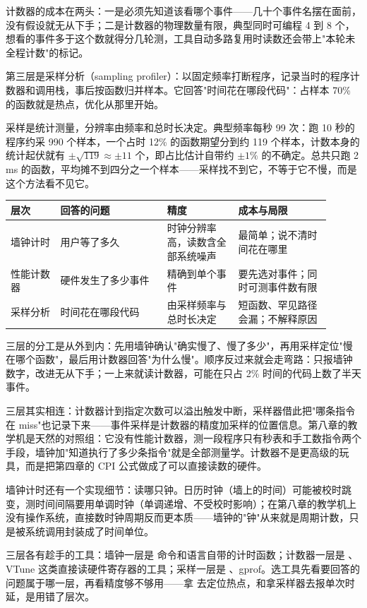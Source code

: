 计数器的成本在两头：一是必须先知道该看哪个事件——几十个事件名摆在面前，没有假设就无从下手；二是计数器的物理数量有限，典型同时可编程 4 到 8 个，想看的事件多于这个数就得分几轮测，工具自动多路复用时读数还会带上"本轮未全程计数"的标记。

第三层是采样分析（sampling profiler）：以固定频率打断程序，记录当时的程序计数器和调用栈，事后按函数归并样本。它回答"时间花在哪段代码"：占样本 70\% 的函数就是热点，优化从那里开始。

采样是统计测量，分辨率由频率和总时长决定。典型频率每秒 99 次：跑 10 秒的程序约采 990 个样本，一个占时 12\% 的函数期望分到约 119 个样本，计数本身的统计起伏就有 $\pm\sqrt{119}\approx\pm11$ 个，即占比估计自带约 $\pm1\%$ 的不确定。总共只跑 2 ms 的函数，平均摊不到四分之一个样本——采样找不到它，不等于它不慢，而是这个方法看不见它。

\begin{longtable}{L{0.14\linewidth}L{0.30\linewidth}L{0.20\linewidth}L{0.26\linewidth}}
\toprule
层次 & 回答的问题 & 精度 & 成本与局限 \\
\midrule
墙钟计时 & 用户等了多久 & 时钟分辨率高，读数含全部系统噪声 & 最简单；说不清时间花在哪里 \\
性能计数器 & 硬件发生了多少事件 & 精确到单个事件 & 要先选对事件；同时可测事件数有限 \\
采样分析 & 时间花在哪段代码 & 由采样频率与总时长决定 & 短函数、罕见路径会漏；不解释原因 \\
\bottomrule
\end{longtable}

三层的分工是从外到内：先用墙钟确认"确实慢了、慢了多少"，再用采样定位"慢在哪个函数"，最后用计数器回答"为什么慢"。顺序反过来就会走弯路：只报墙钟数字，改进无从下手；一上来就读计数器，可能在只占 2\% 时间的代码上数了半天事件。

三层其实相连：计数器计到指定次数可以溢出触发中断，采样器借此把"哪条指令在 miss"也记录下来——事件采样是计数器的精度加采样的位置信息。第八章的教学机是天然的对照组：它没有性能计数器，测一段程序只有秒表和手工数指令两个手段，墙钟加"知道执行了多少条指令"就是全部测量学。计数器不是更高级的玩具，而是把第四章的 CPI 公式做成了可以直接读数的硬件。

墙钟计时还有一个实现细节：读哪只钟。日历时钟（墙上的时间）可能被校时跳变，测时间间隔要用单调时钟（单调递增、不受校时影响）；在第八章的教学机上没有操作系统，直接数时钟周期反而更本质——墙钟的"钟"从来就是周期计数，只是被系统调用封装成了时间单位。

三层各有趁手的工具：墙钟一层是  命令和语言自带的计时函数；计数器一层是 、VTune 这类直接读硬件寄存器的工具；采样一层是 、gprof。选工具先看要回答的问题属于哪一层，再看精度够不够用——拿  去定位热点，和拿采样器去报单次时延，是用错了层次。

